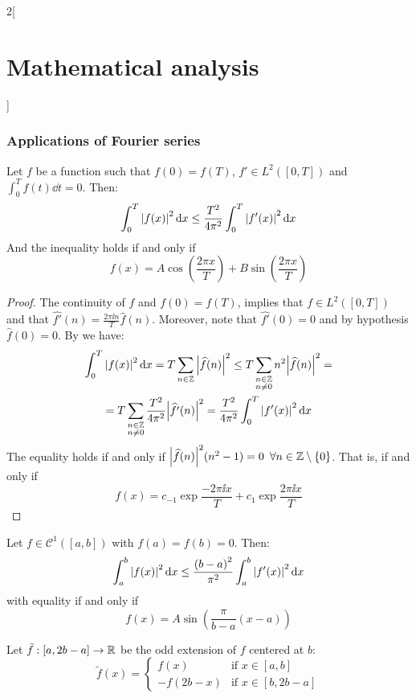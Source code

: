 \documentclass[../../../main_math.tex]{subfiles}
\begin{document}
\begin{multicols}{2}[\section{Mathematical analysis}]
  \subsubsection{Applications of Fourier series}
  \begin{theorem}\label{MA:wirtinger1}
    Let $f$ be a function such that $f(0)=f(T)$, $f'\in L^2([0,T])$ and $\displaystyle\int_0^Tf(t)\dd{t}=0$. Then: $$\int_0^T\abs{f(x)}^2\dd{x}\leq\frac{T^2}{4\pi^2}\int_0^T\abs{f'(x)}^2\dd{x}$$ And the inequality holds if and only if $$f(x)=A\cos\left(\frac{2\pi x}{T}\right)+B\sin\left(\frac{2\pi x}{T}\right)$$
  \end{theorem}
  \begin{proof}
    The continuity of $f$ and $f(0)=f(T)$, implies that $f\in L^2([0,T])$ and that $\widehat{f'}(n)=\frac{2\pi\ii n}{T}\widehat{f}(n)$. Moreover, note that $\widehat{f'}(0)=0$ and by hypothesis $\widehat{f}(0)=0$. By  we have:
    \begin{multline*}
      \int_0^T\abs{f(x)}^2\dd{x} = T\sum_{n\in\mathbb{Z}}\abs{\widehat{f}(n)}^2 \leq T\sum_{\substack{n\in\mathbb{Z}                  \\n\ne 0}}n^2\abs{\widehat{f}(n)}^2=\\
      = T\sum_{\substack{n\in\mathbb{Z}                     \\n\ne 0}}\frac{T^2}{4\pi^2}\abs{\widehat{f'}(n)}^2=\frac{T^2}{4\pi^2}\int_0^T\abs{f'(x)}^2\dd{x}
    \end{multline*}
    The equality holds if and only if $\abs{\widehat{f}(n)}^2(n^2 - 1)=0$ $\forall n\in\mathbb{Z}\setminus\{0\}$. That is, if and only if $$f(x)=c_{-1}\exp{\frac{-2\pi\ii x}{T}}+c_{1}\exp{\frac{2\pi\ii x}{T}}$$
  \end{proof}
  \begin{theorem}\label{MA:wirtinger2}
    Let $f\in \mathcal{C}^1([a,b])$ with $f(a)=f(b)=0$. Then: $$\int_a^b\abs{f(x)}^2\dd{x}\leq\frac{{(b-a)}^2}{\pi^2}\int_a^b\abs{f'(x)}^2\dd{x}$$
    with equality if and only if $$f(x)=A\sin\left(\frac{\pi}{b-a}(x-a)\right)$$
  \end{theorem}
  \begin{sproof}
    Let $\tilde{f}:[a,2b-a]\rightarrow\mathbb{R}$ be the odd extension of $f$ centered at $b$:
    $$
      \tilde{f}(x)=\begin{cases}
        f(x)     & \text{if }x\in[a,b]    \\
        -f(2b-x) & \text{if }x\in[b,2b-a]
      \end{cases}
    $$

\end{sproof}
\end{multicols}
\end{document}
